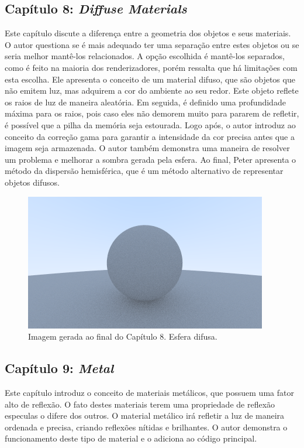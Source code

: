 \documentclass[journal]{IEEEtran}
\begin{document}
\subsection*{Capítulo 8: \emph{Diffuse Materials}}
Este capítulo discute a diferença entre a geometria dos objetos e seus materiais. O autor questiona se é
mais adequado ter uma separação entre estes objetos ou se seria melhor mantê-los relacionados. A opção
escolhida é mantê-los separados, como é feito na maioria dos renderizadores, porém ressalta que há 
limitações com esta escolha. Ele apresenta o conceito de um material difuso, que são objetos que não
emitem luz, mas adquirem a cor do ambiente ao seu redor. Este objeto reflete os raios de luz de maneira
aleatória. Em seguida, é definido uma profundidade máxima para os raios, pois caso eles não demorem
muito para pararem de refletir, é possível que a pilha da memória seja estourada. Logo após, o autor 
introduz ao conceito da correção gama para garantir a intensidade da cor precisa antes que a imagem seja
armazenada. O autor também demonstra uma maneira de resolver um problema e melhorar a sombra gerada pela
esfera. Ao final, Peter apresenta o método da dispersão hemisférica, que é um método alternativo de 
representar objetos difusos.

\begin{figure}[ht]
  \centering
  \includegraphics[width=\linewidth]{media/img-1.10-rand-hemispherical.png}
  \caption{Imagem gerada ao final do Capítulo 8. Esfera difusa.}
  \label{img_difuse}
\end{figure}


\subsection*{Capítulo 9: \emph{Metal}}
Este capítulo introduz o conceito de materiais metálicos, que possuem uma fator alto de reflexão. O fato
destes materiais terem uma propriedade de reflexão especulas o difere dos outros. O material metálico
irá refletir a luz de maneira ordenada e precisa, criando reflexões nítidas e brilhantes. O autor demonstra
o funcionamento deste tipo de material e o adiciona ao código principal.
\end{document}
